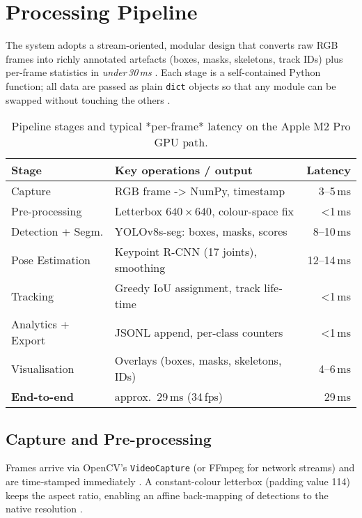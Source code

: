 \section{Processing Pipeline}

The system adopts a stream-oriented, modular design that converts raw RGB frames into richly annotated artefacts (boxes, masks, skeletons, track IDs) plus per-frame statistics in \emph{under\,30\,ms} \cite{bochkovskiy2020yolov4,bradski2008learning}.  
Each stage is a self-contained Python function; all data are passed as plain \texttt{dict} objects so that any module can be swapped without touching the others \cite{paszke2019pytorch}.

\begin{table}[ht]
  \centering
  \caption{Pipeline stages and typical *per-frame* latency on the Apple M2 Pro GPU path.}
  \label{tab:pipeline}
  \begin{tabularx}{\linewidth}{@{}l X r@{}}
    \toprule
    \textbf{Stage} & \textbf{Key operations / output} & \textbf{Latency} \\
    \midrule
    Capture             & RGB frame -> NumPy, timestamp             & 3--5\,ms \\
    Pre-processing      & Letterbox $640\times640$, colour-space fix & <1\,ms \\
    Detection + Segm.   & YOLOv8s-seg: boxes, masks, scores         & 8--10\,ms \\
    Pose Estimation     & Keypoint R-CNN (17 joints), smoothing     & 12--14\,ms \\
    Tracking            & Greedy IoU assignment, track life‐time    & <1\,ms \\
    Analytics + Export  & JSONL append, per-class counters          & <1\,ms \\
    Visualisation       & Overlays (boxes, masks, skeletons, IDs)   & 4--6\,ms \\
    \midrule
    \textbf{End-to-end} & approx.\ 29\,ms (34\,fps)                 & 29\,ms \\
    \bottomrule
  \end{tabularx}
\end{table}

\subsection{Capture and Pre-processing}
Frames arrive via OpenCV's \texttt{VideoCapture} (or FFmpeg for network streams) and are time‐stamped immediately \cite{bradski2008learning}.  
A constant-colour letterbox (padding value 114) keeps the aspect ratio, enabling an affine back‐mapping of detections to the native resolution \cite{redmon2018yolov3}.

